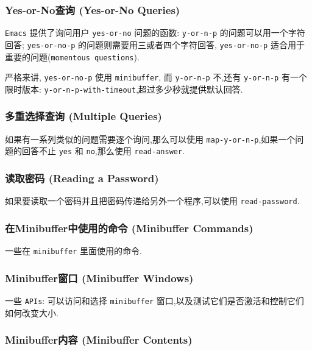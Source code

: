 \documentclass[11pt]{article}
\begin{document}
\subsubsection{Yes-or-No查询 (Yes-or-No Queries)}
\label{sec:org8cf0f18}

\texttt{Emacs} 提供了询问用户 \texttt{yes-or-no} 问题的函数: \texttt{y-or-n-p} 的问题可以用一个字符回答; \texttt{yes-or-no-p} 的问题则需要用三或者四个字符回答, \texttt{yes-or-no-p} 适合用于重要的问题(\texttt{momentous questions}).

严格来讲, \texttt{yes-or-no-p} 使用 \texttt{minibuffer}, 而 \texttt{y-or-n-p} 不,还有 \texttt{y-or-n-p} 有一个限时版本: \texttt{y-or-n-p-with-timeout},超过多少秒就提供默认回答.


\subsubsection{多重选择查询 (Multiple Queries)}
\label{sec:orga84b93c}

如果有一系列类似的问题需要逐个询问,那么可以使用 \texttt{map-y-or-n-p},如果一个问题的回答不止 \texttt{yes} 和 \texttt{no},那么使用 \texttt{read-answer}.

\subsubsection{读取密码 (Reading a Password)}
\label{sec:org61a5e0f}

如果要读取一个密码并且把密码传递给另外一个程序,可以使用 \texttt{read-password}.

\subsubsection{在Minibuffer中使用的命令 (Minibuffer Commands)}
\label{sec:orgd737d64}

一些在 \texttt{minibuffer} 里面使用的命令.

\subsubsection{Minibuffer窗口 (Minibuffer Windows)}
\label{sec:orgeddc1fb}

一些 \texttt{APIs}: 可以访问和选择 \texttt{minibuffer} 窗口,以及测试它们是否激活和控制它们如何改变大小.

\subsubsection{Minibuffer内容 (Minibuffer Contents)}
\label{sec:orgc477dfc}
\end{document}
